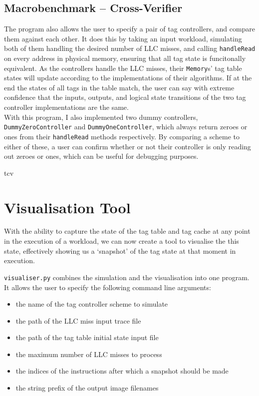 \subsection{Macrobenchmark -- Cross-Verifier}
The program also allows the user to specify a pair of tag controllers, and compare them against each other. It does this by taking an input workload, simulating both of them handling the desired number of LLC misses, and calling \texttt{handleRead} on every address in physical memory, ensuring that all tag state is funcitonally equivalent. As the controllers handle the LLC misses, their \texttt{Memory}s' tag table states will update according to the implementations of their algorithms. If at the end the states of all tags in the table match, the user can say with extreme confidence that the inputs, outputs, and logical state transitions of the two tag controller implementations are the same.\\
With this program, I also implemented two dummy controllers, \texttt{DummyZeroController} and \texttt{DummyOneController}, which always return zeroes or ones from their \texttt{handleRead} methods respectively. By comparing a scheme to either of these, a user can confirm whether or not their controller is only reading out zeroes or ones, which can be useful for debugging purposes.

\begin{algorithm}[H]
	\centering
	{tcv}
	\caption{\texttt{verify.cpp}'s \texttt{crossVerify} function}
	\label{code:tcv}
\end{algorithm}

\section{Visualisation Tool}
With the ability to capture the state of the tag table and tag cache at any point in the execution of a workload, we can now create a tool to visualise the this state, effectively showing us a `snapshot' of the tag state at that moment in execution.

\texttt{visualiser.py} combines the simulation and the visualisation into one program. It allows the user to specify the following command line arguments:
\begin{itemize}
	\item the name of the tag controller scheme to simulate
	\item the path of the LLC miss input trace file
	\item the path of the tag table initial state input file
	\item the maximum number of LLC misses to process
	\item the indices of the instructions after which a snapshot should be made
	\item the string prefix of the output image filenames
\end{itemize}

